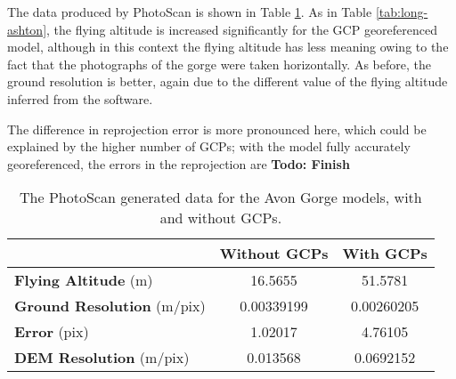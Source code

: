 The data produced by PhotoScan is shown in Table \ref{tab:avon-gorge}. As in
Table \ref{tab:long-ashton}, the flying altitude is increased significantly for
the GCP georeferenced model, although in this context the flying altitude has
less meaning owing to the fact that the photographs of the gorge were taken
horizontally. As before, the ground resolution is better, again due to the
different value of the flying altitude inferred from the software.

The difference in reprojection error is more pronounced here, which could be
explained by the higher number of GCPs; with the model fully accurately
georeferenced, the errors in the reprojection are \textbf{Todo: Finish}

\begin{table}
    \begin{tabular}{| l | c | c |}
        \hline
        & \textbf{Without GCPs} & \textbf{With GCPs} \\
        \hline
        \textbf{Flying Altitude} (m)       & 16.5655    & 51.5781    \\
        \textbf{Ground Resolution} (m/pix) & 0.00339199 & 0.00260205 \\
        \textbf{Error} (pix)               & 1.02017    & 4.76105    \\
        \textbf{DEM Resolution} (m/pix)    & 0.013568   & 0.0692152  \\
        \hline
    \end{tabular}
    \caption{The PhotoScan generated data for the Avon Gorge models, with and
    without GCPs.}
    \label{tab:avon-gorge}
\end{table}
